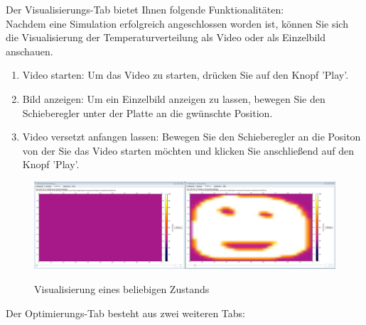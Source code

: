 \newpage
\noindent
Der Visualisierungs-Tab bietet Ihnen folgende Funktionalitäten:\\
Nachdem eine Simulation erfolgreich angeschlossen worden ist, können Sie sich die Visualisierung der Temperaturverteilung als Video oder als Einzelbild anschauen.
\begin{enumerate}
\item Video starten: Um das Video zu starten, drücken Sie auf den Knopf 'Play'.
\item Bild anzeigen: Um ein Einzelbild anzeigen zu lassen, bewegen Sie den Schieberegler unter der Platte an die gwünschte Position.
\item Video versetzt anfangen lassen: Bewegen Sie den Schieberegler an die Positon von der Sie das Video starten möchten und klicken Sie anschließend auf den Knopf 'Play'.
\end{enumerate}
\begin{figure}[H]
\centering
\includegraphics[scale=.25]{Bilder/Visualisieren.png}\\
\caption{Visualisierung eines beliebigen Zustands}
\label{Visualisieren}
\end{figure}


\newpage
\noindent
Der Optimierungs-Tab besteht aus zwei weiteren Tabs:\\

